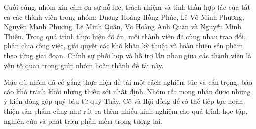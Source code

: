 Cuối cùng, nhóm xin cảm ơn sự nỗ lực, trách nhiệm và tinh thần hợp tác của tất cả các thành viên trong nhóm: Dương Hoàng Hồng Phúc, Lê Võ Minh Phương, Nguyễn Mạnh Phương, Lê Minh Quân, Võ Hoàng Anh Quân và Nguyễn Minh Thiện. Trong quá trình thực hiện đồ án, mỗi thành viên đã cùng nhau trao đổi, phân chia công việc, giải quyết các khó khăn kỹ thuật và hoàn thiện sản phẩm theo từng giai đoạn. Chính sự phối hợp và hỗ trợ lẫn nhau giữa các thành viên là yếu tố quan trọng giúp nhóm hoàn thành đề tài này.

Mặc dù nhóm đã cố gắng thực hiện đề tài một cách nghiêm túc và cẩn trọng, báo cáo khó tránh khỏi những thiếu sót nhất định. Nhóm rất mong nhận được những ý kiến đóng góp quý báu từ quý Thầy, Cô và Hội đồng để có thể tiếp tục hoàn thiện sản phẩm cũng như rút ra thêm nhiều kinh nghiệm cho quá trình học tập, nghiên cứu và phát triển phần mềm trong tương lai.
